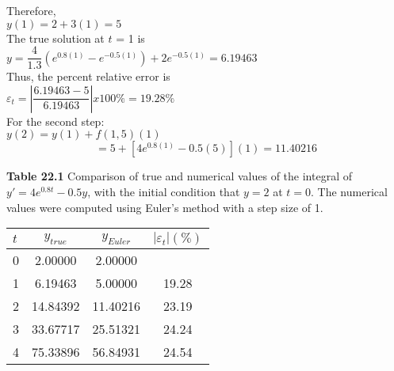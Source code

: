 Therefore,\\

$y(1) = 2 + 3(1) = 5$\\

The true solution at $t$ = 1 is\\

$y=\dfrac{4}{1.3} \left(e^{0.8(1)} - e^{-0.5(1)} \right) + 2e^{-0.5(1)} = 6.19463$\\

Thus, the percent relative error is\\

$\varepsilon_{t} = \left| \dfrac{6.19463 - 5}{6.19463} \right| x 100 \% = 19.28 \% $\\

For the second step:\\

$y(2) = y(1) + f(1,5)(1)$
$$= 5 + [4e^{0.8(1)} - 0.5(5)](1) = 11.40216 $$


\vspace{0,3in}
\textbf{Table 22.1}
Comparison of true and numerical values of the integral
of $y' = 4e^{0.8t} - 0.5y$, with the initial condition that $y = 2$ at $t = 0$. The numerical values were computed using Euler’s
method with a step size of 1.\\
\begin{tabular}{lccc}
\hline

	\textbf{$t$} \; \; \; \; \; & \textbf{$y_{true}$} \; \; \; \; \; & \textbf{$y_{Euler}$} \; \; \; \; \; &  \textbf{$\left|\varepsilon_{t}\right|( \% )$}\\
	
\hline

	0 \; \; \; \; \; & 2.00000 \; \; \; \; \; & 2.00000 \; \; \; \; \; & \vspace{}\\
	
	1 \; \; \; \; \; & 6.19463 \; \; \; \; \; & 5.00000 \; \; \; \; \; & 19.28\\

	2 \; \; \; \; \; & 14.84392 \; \; \; \; \; & 11.40216 \; \; \; \; \; & 23.19\\

	3 \; \; \; \; \; & 33.67717 \; \; \; \; \; & 25.51321 \; \; \; \; \; & 24.24\\

	4 \; \; \; \; \; & 75.33896 \; \; \; \; \; & 56.84931 \; \; \; \; \; & 24.54\\

\hline
\end{tabular}


